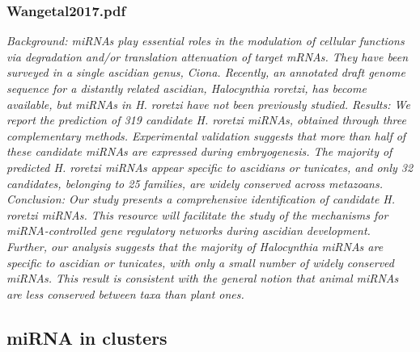 \documentclass[graybox]{svmult}
\begin{document}
\subsubsection{Wangetal2017.pdf}
\cite{Wang2017}
\textit{Background: miRNAs play essential roles in the modulation of cellular functions via degradation and/or translation
attenuation of target mRNAs. They have been surveyed in a single ascidian genus, Ciona. Recently, an annotated
draft genome sequence for a distantly related ascidian, Halocynthia roretzi, has become available, but miRNAs in
H. roretzi have not been previously studied.
Results: We report the prediction of 319 candidate H. roretzi miRNAs, obtained through three complementary
methods. Experimental validation suggests that more than half of these candidate miRNAs are expressed during
embryogenesis. The majority of predicted H. roretzi miRNAs appear specific to ascidians or tunicates, and only 32
candidates, belonging to 25 families, are widely conserved across metazoans.
Conclusion: Our study presents a comprehensive identification of candidate H. roretzi miRNAs. This resource
will facilitate the study of the mechanisms for miRNA-controlled gene regulatory networks during ascidian
development. Further, our analysis suggests that the majority of Halocynthia miRNAs are specific to ascidian
or tunicates, with only a small number of widely conserved miRNAs. This result is consistent with the general
notion that animal miRNAs are less conserved between taxa than plant ones.}



\subsection{miRNA in clusters}
\end{document}
